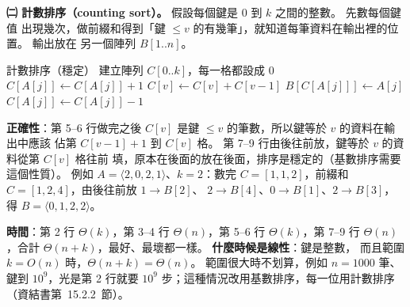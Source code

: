 \begin{pastsoln}
\textbf{㈡ 計數排序（counting sort）。} 假設每個鍵是 $0$ 到 $k$ 之間的整數。 先數每個鍵值
出現幾次，做前綴和得到「鍵 $\le v$ 的有幾筆」，就知道每筆資料在輸出裡的位置。 輸出放在
另一個陣列 $B[1..n]$。
\begin{pseudo}{計數排序（穩定）}
    \State 建立陣列 $C[0..k]$，每一格都設成 $0$
        \State $C[A[j]] \gets C[A[j]] + 1$ 
    \EndFor
        \State $C[v] \gets C[v] + C[v - 1]$ 
    \EndFor
        \State $B[C[A[j]]] \gets A[j]$
        \State $C[A[j]] \gets C[A[j]] - 1$
    \EndFor
\EndProcedure
\end{pseudo}
\textbf{正確性}：第 5--6 行做完之後 $C[v]$ 是鍵 $\le v$ 的筆數，所以鍵等於 $v$ 的資料在輸出中應該
佔第 $C[v-1]+1$ 到 $C[v]$ 格。 第 7--9 行由後往前放，鍵等於 $v$ 的資料從第 $C[v]$ 格往前
填，原本在後面的放在後面，排序是穩定的（基數排序需要這個性質）。 例如 $A = \langle 2, 0, 2,
1 \rangle$、$k = 2$：數完 $C = [1, 1, 2]$，前綴和 $C = [1, 2, 4]$，由後往前放 $1 \to B[2]$、
$2 \to B[4]$、$0 \to B[1]$、$2 \to B[3]$，得 $B = \langle 0, 1, 2, 2 \rangle$。

\textbf{時間}：第 2 行 $\Theta(k)$，第 3--4 行 $\Theta(n)$，第 5--6 行 $\Theta(k)$，第 7--9
行 $\Theta(n)$，合計 $\Theta(n + k)$，最好、最壞都一樣。 \textbf{什麼時候是線性}：鍵是整數，
而且範圍 $k = O(n)$ 時，$\Theta(n + k) = \Theta(n)$。 範圍很大時不划算，例如 $n = 1000$
筆、鍵到 $10^9$，光是第 2 行就要 $10^9$ 步；這種情況改用基數排序，每一位用計數排序
（資結書第~15.2.2~節）。
\end{pastsoln}
